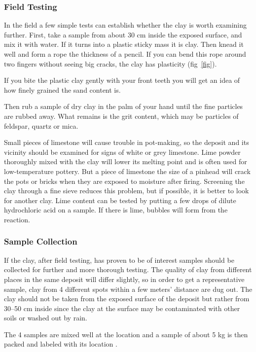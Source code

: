 \subsubsection{Field Testing}
In the field a few simple tests can establish whether the clay is worth 
examining further. First, take a sample from about 30 cm inside the exposed 
surface, and mix it with water. If it turns into a plastic sticky mass it is 
clay. Then knead it well and form a rope the thickness of a pencil. If you can 
bend this rope around two fingers without seeing big cracks, the clay has 
plasticity (fig~\ref{fig}).

If you bite the plastic clay gently with your front teeth you will get an idea 
of how finely grained the sand content is.

Then rub a sample of dry clay in the palm of your hand until the fine particles 
are rubbed away. What remains is the grit content, which may be particles of 
feldspar, quartz or mica.

Small pieces of limestone will cause trouble in pot-making, so the deposit and 
its vicinity should be examined for signs of white or grey limestone. Lime 
powder thoroughly mixed with the clay will lower its melting point and is often 
used for low-temperature pottery. But a piece of limestone the size of a 
pinhead will crack the pots or bricks when they are exposed to moisture after 
firing. Screening the clay through a fine sieve reduces this problem, but if 
possible, it is better to look for another clay. Lime content can be tested by 
putting a few drops of dilute hydrochloric acid on a sample. If there is lime, 
bubbles will form from the reaction.
\subsubsection{Sample Collection}
If the clay, after field testing, has proven to be of interest samples should 
be collected for further and more thorough testing. The quality of clay from 
different places in the same deposit will differ slightly, so in order to get a 
representative sample, clay from 4 different spots within a few meters' 
distance are dug out. The clay should not be taken from the exposed surface of 
the deposit but rather from 30--50 cm inside since the clay at the surface may 
be contaminated with other soils or washed out by rain.

The 4 samples are mixed well at the location and a sample of about 5 kg is then 
packed and labeled with its location .

